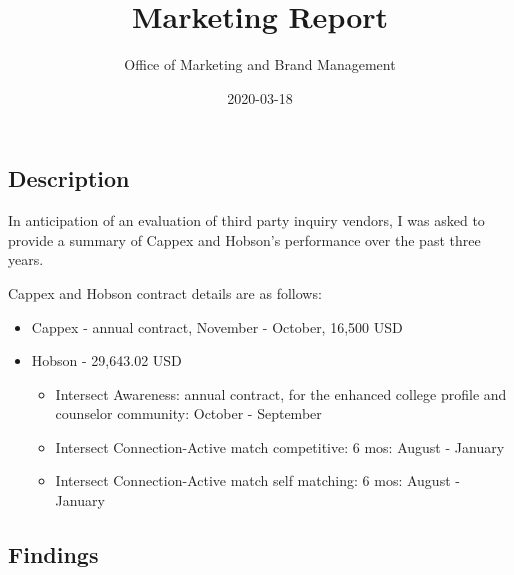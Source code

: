 \documentclass[
]{article}
\title{Marketing Report}
\subtitle{Office of Marketing and Brand Management}
\author{}
\date{\vspace{-2.5em}2020-03-18}
\begin{document}
\maketitle

\hypertarget{description}{%
\subsection{Description}\label{description}}

In anticipation of an evaluation of third party inquiry vendors, I was
asked to provide a summary of Cappex and Hobson's performance over the
past three years.

Cappex and Hobson contract details are as follows:

\begin{itemize}
\item
  Cappex - annual contract, November - October, 16,500 USD
\item
  Hobson - 29,643.02 USD

  \begin{itemize}
  \item
    Intersect Awareness: annual contract, for the enhanced college
    profile and counselor community: October - September
  \item
    Intersect Connection-Active match competitive: 6 mos: August -
    January
  \item
    Intersect Connection-Active match self matching: 6 mos: August -
    January
  \end{itemize}
\end{itemize}

\hypertarget{findings}{%
\subsection{Findings}\label{findings}}
\end{document}
